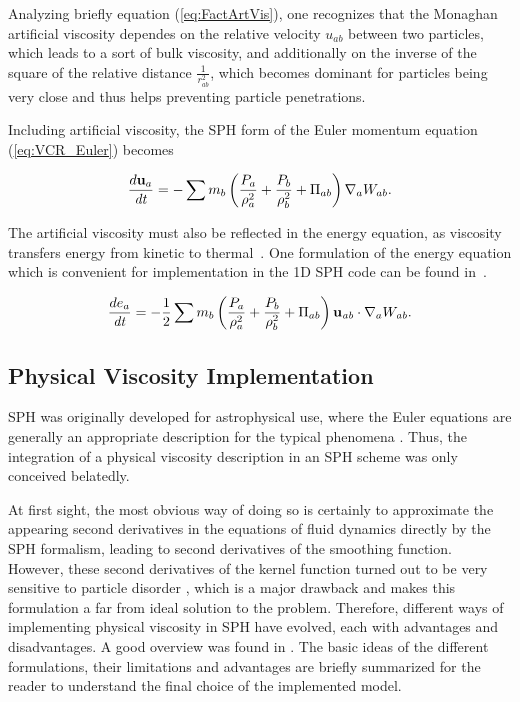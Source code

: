 \documentclass[11pt,a4paper,twoside]{report}
\begin{document}
Analyzing briefly equation (\ref{eq:FactArtVis}), one recognizes that the Monaghan artificial viscosity dependes on the relative velocity $u_{ab}$ between two particles, which leads to a sort of bulk viscosity, and additionally on the inverse of the square of the relative distance $\frac{1}{r_{ab}^2}$, which becomes dominant for particles being very close and thus helps preventing particle penetrations. 

Including artificial viscosity, the SPH form of the Euler momentum equation (\ref{eq:VCR_Euler}) becomes~\cite{Monaghan2005}

\begin{equation}
\label{eq:VCR_EulerInclArtVis}
\frac{ d{\bf u}_{a}}{\mathit{dt}}=-\sum {m_{b}\left(\frac{P_{a}}{\rho_{a}^{2}}+\frac{P_{b}}{\rho _{b}^{2}}+\Pi _{ab}\right)\nabla_{a}W_{ab}}.
\end{equation}



The artificial viscosity must also be reflected in the energy equation, as viscosity transfers energy from kinetic to thermal~\cite{Monaghan2005}. One formulation of the energy equation which is convenient for implementation in the 1D SPH code %
can be found in~\cite{Liu2003}.

\begin{equation}
\label{eq:ECR_EulerInclArtVis}
\frac{de_{a}}{\mathit{dt}}=-\mathit{}\frac{1}{2}\sum{m_{b}\left(\frac{P_{a}}{\rho _{a}^{2}}+\frac{P_{b}}{\rho _{b}^{2}}+\Pi _{ab}\right){\bf u_{\mathit{ab}}}\cdot\nabla _{a}W_{\mathit{ab}}}.
\end{equation}

\subsection{Physical Viscosity Implementation}
\label{sec:PhysViscDescr}

SPH was originally developed for astrophysical use, where the Euler equations are generally an appropriate description for the typical phenomena \cite{Liu2003}. Thus, the integration of a physical viscosity description in an SPH scheme was only conceived belatedly. 

At first sight, the most obvious way of doing so is certainly to approximate the appearing second derivatives in the equations of fluid dynamics directly by the SPH formalism, leading to second derivatives of the smoothing function. However, these second derivatives of the kernel function turned out to be very sensitive to particle disorder \cite{Brookshaw1986,Monaghan1988}, which is a major drawback and makes this formulation a far from ideal solution to the problem. Therefore, different ways of implementing physical viscosity in SPH have evolved, each with advantages and disadvantages. A good overview was found in \cite{Basa2009}. The basic ideas of the different formulations, their limitations and advantages are briefly summarized for the reader to understand the final choice of the implemented model.
\end{document}
